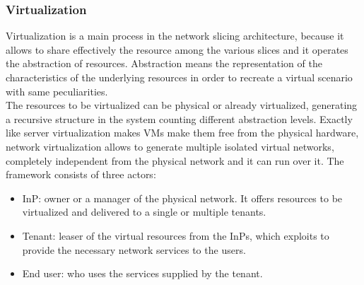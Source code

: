 \documentclass[a4paper,12pt]{report} %
\begin{document}
\subsubsection{Virtualization}
Virtualization is a main process in the network slicing architecture,
because it allows to share effectively the resource among the various
slices and it operates the abstraction of resources. Abstraction means the representation of the characteristics of the underlying resources in order to recreate a virtual scenario with same peculiarities. \\
The resources to be virtualized can be physical or already virtualized, generating a
recursive structure in the system counting different abstraction levels.
Exactly like server virtualization makes \gls{VM}s make them free from the physical hardware, network virtualization allows
to generate multiple isolated virtual networks, completely independent from the physical network and it can run over it.
The framework consists of three actors:
\begin{itemize}
\item \gls{InP}: owner or a manager of the physical network. It offers resources to be virtualized and delivered to a single or multiple tenants.
\end{itemize}
\begin{itemize}
\item Tenant: leaser of the virtual resources from the InPs, which exploits to provide the necessary network services to the users. 
\end{itemize}
\begin{itemize}
\item End user: who uses the services supplied by the tenant.
\end{itemize}
\cite{etsi2017gs} \cite{ordonez2017network} \cite{marsch20185g}
\end{document}
